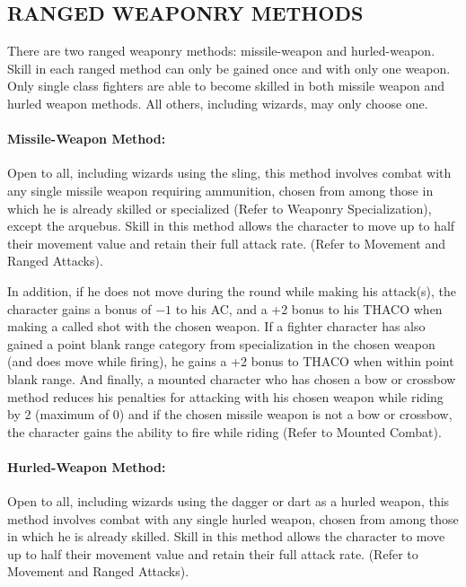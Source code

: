 \begin{multicols}{2}

\subsection{RANGED WEAPONRY METHODS}

There are two ranged weaponry methods: missile-weapon and hurled-weapon.  Skill in each ranged method can only be gained once and with only one weapon.  Only single class fighters are able to become skilled in both missile weapon and hurled weapon methods.  All others, including wizards, may only choose one.

\paragraph{Missile-Weapon Method:} Open to all, including wizards using the sling, this method involves combat with any single missile weapon requiring ammunition, chosen from among those in which he is already skilled or specialized (Refer to Weaponry Specialization), except the arquebus.  Skill in this method allows the character to move up to half their movement value and retain their full attack rate. (Refer to Movement and Ranged Attacks).  

In addition, if he does not move during the round while making his attack(s), the character gains a bonus of $-1$ to his AC, and a +2 bonus to his THACO when making a called shot with the chosen weapon.  If a fighter character has also gained a point blank range category from specialization in the chosen weapon (and does move while firing), he gains a +2 bonus to THACO when within point blank range.  And finally, a mounted character who has chosen a bow or crossbow method reduces his penalties for attacking with his chosen weapon while riding by 2 (maximum of 0) and if the chosen missile weapon is not a bow or crossbow, the character gains the ability to fire while riding (Refer to Mounted Combat).
 
\paragraph{Hurled-Weapon Method:} Open to all, including wizards using the dagger or dart as a hurled weapon, this method involves combat with any single hurled weapon, chosen from among those in which he is already skilled.  Skill in this method allows the character to move up to half their movement value and retain their full attack rate. (Refer to Movement and Ranged Attacks).  


\end{multicols}
